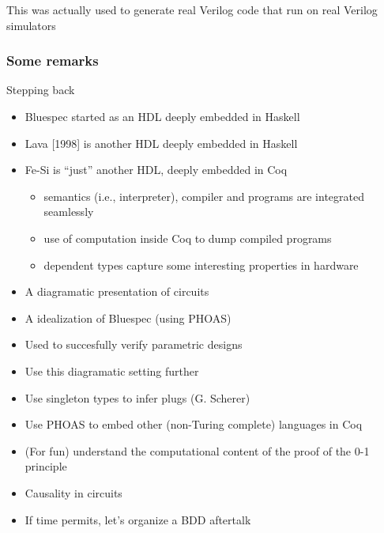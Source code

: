 \documentclass[9pt]{beamer}
\newcommand\fesi{Fe-Si}
\begin{document}
{
  This was actually used to generate real Verilog code that run on real Verilog simulators
}

\begin{frame}[fragile]
  \frametitle{Some remarks}
  Stepping back
  \begin{itemize}
  \item Bluespec started as an HDL deeply embedded in Haskell
  \item Lava [1998] is another HDL deeply embedded in Haskell
  \item \fesi{} is ``just'' another HDL,  deeply embedded in \alert{Coq}
    \pause
    \begin{itemize}
    \item semantics (i.e., interpreter), compiler and programs are \alert{integrated seamlessly}
    \item use of computation \alert{inside} Coq to dump compiled programs
    \item dependent types capture some interesting properties in hardware
    \end{itemize}
  \end{itemize}
\end{frame}


{

  \begin{itemize}
  \item A diagramatic presentation of circuits
  \item A idealization of Bluespec (using PHOAS)
  \item Used to succesfully verify parametric designs
  \end{itemize}
}

{
  \begin{itemize}
  \item Use this diagramatic setting further
  \item Use singleton types to infer plugs (G. Scherer)
  \item Use PHOAS to embed other (non-Turing complete) languages in Coq
  \item (For fun) understand the computational content of the proof of the 0-1 principle
  \item Causality in circuits    

  \item If time permits, let's organize a BDD aftertalk
  \end{itemize}
}
\end{document}
